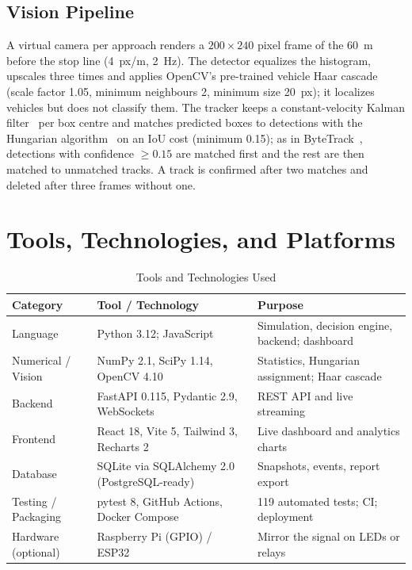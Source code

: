 \subsection{Vision Pipeline}
A virtual camera per approach renders a $200\times240$ pixel frame of the 60~m before the stop line (4~px/m, 2~Hz). The detector equalizes the histogram, upscales three times and applies OpenCV's pre-trained vehicle Haar cascade~\cite{ref16} (scale factor 1.05, minimum neighbours 2, minimum size 20~px); it localizes vehicles but does not classify them. The tracker keeps a constant-velocity Kalman filter~\cite{ref18} per box centre and matches predicted boxes to detections with the Hungarian algorithm~\cite{ref19} on an IoU cost (minimum 0.15); as in ByteTrack~\cite{ref17}, detections with confidence $\ge 0.15$ are matched first and the rest are then matched to unmatched tracks. A track is confirmed after two matches and deleted after three frames without one.

\section{Tools, Technologies, and Platforms}

\begin{table}[H]
\centering
\caption{Tools and Technologies Used}
\label{tab:tools}
\small
\begin{tabular}{@{}p{3.5cm}p{5cm}p{6cm}@{}}
\toprule
\textbf{Category} & \textbf{Tool / Technology} & \textbf{Purpose} \\
\midrule
Language             & Python 3.12; JavaScript & Simulation, decision engine, backend; dashboard \\
Numerical / Vision   & NumPy 2.1, SciPy 1.14, OpenCV 4.10 & Statistics, Hungarian assignment; Haar cascade \\
Backend              & FastAPI 0.115, Pydantic 2.9, WebSockets & REST API and live streaming \\
Frontend             & React 18, Vite 5, Tailwind 3, Recharts 2 & Live dashboard and analytics charts \\
Database             & SQLite via SQLAlchemy 2.0 (PostgreSQL-ready) & Snapshots, events, report export \\
Testing / Packaging  & pytest 8, GitHub Actions, Docker Compose & 119 automated tests; CI; deployment \\
Hardware (optional)  & Raspberry Pi (GPIO) / ESP32 & Mirror the signal on LEDs or relays \\
\bottomrule
\end{tabular}
\end{table}

